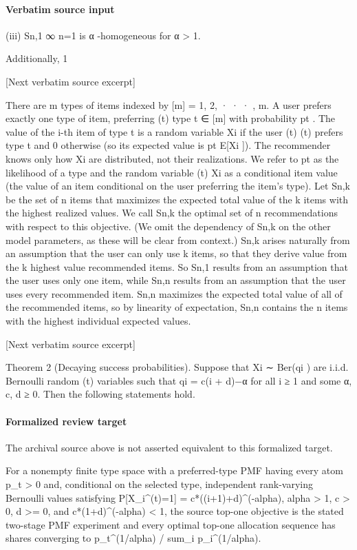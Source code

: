\documentclass[10pt]{article}
\begin{document}
\paragraph{Verbatim source input}
\begin{ReviewVerbatim}
(iii) {Sn,1 }∞
n=1 is α -homogeneous for α > 1.

Additionally,
1

[Next verbatim source excerpt]

There are m types of items indexed by [m] = {1, 2, · · · , m}. A user prefers exactly one type of item, preferring
(t)
type t ∈ [m] with probability pt . The value of the i-th item of type t is a random variable Xi if the user
(t)
(t)
prefers type t and 0 otherwise (so its expected value is pt E[Xi ]). The recommender knows only how Xi
are distributed, not their realizations. We refer to pt as the likelihood of a type and the random variable
(t)
Xi as a conditional item value (the value of an item conditional on the user preferring the item’s type).
Let Sn,k be the set of n items that maximizes the expected total value of the k items with the highest
realized values. We call Sn,k the optimal set of n recommendations with respect to this objective. (We omit
the dependency of Sn,k on the other model parameters, as these will be clear from context.)
Sn,k arises naturally from an assumption that the user can only use k items, so that they derive value
from the k highest value recommended items. So Sn,1 results from an assumption that the user uses only
one item, while Sn,n results from an assumption that the user uses every recommended item.
Sn,n maximizes the expected total value of all of the recommended items, so by linearity of expectation,
Sn,n contains the n items with the highest individual expected values.

[Next verbatim source excerpt]

Theorem 2 (Decaying success probabilities). Suppose that Xi ∼ Ber(qi ) are i.i.d. Bernoulli random
(t)
variables such that qi = c(i + d)−α for all i ≥ 1 and some α, c, d ≥ 0. Then the following statements hold.
\end{ReviewVerbatim}


\paragraph{Formalized review target}
The archival source above is not asserted equivalent to this formalized target.
\begin{ReviewVerbatim}
For a nonempty finite type space with a preferred-type PMF having every atom p_t > 0 and, conditional on the selected type, independent rank-varying Bernoulli values satisfying P[X_i^(t)=1] = c*((i+1)+d)^(-alpha), alpha > 1, c > 0, d >= 0, and c*(1+d)^(-alpha) < 1, the source top-one objective is the stated two-stage PMF experiment and every optimal top-one allocation sequence has shares converging to p_t^(1/alpha) / sum_i p_i^(1/alpha).
\end{ReviewVerbatim}
\end{document}
